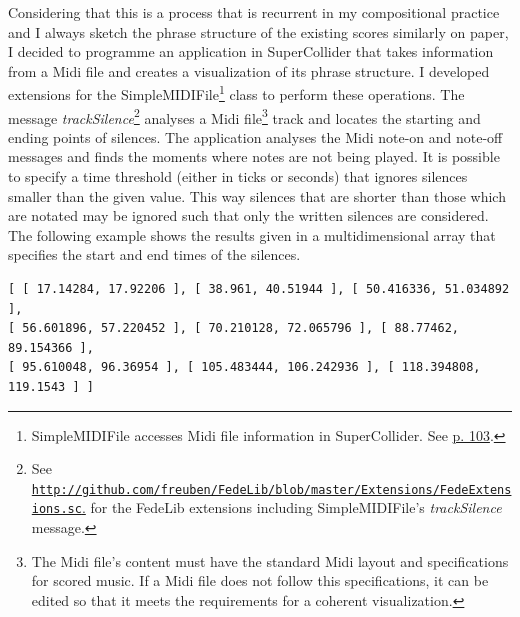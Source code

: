 Considering that this is a process that is recurrent in my compositional practice and I always sketch the phrase structure of the existing scores similarly on paper, I decided to programme an application in SuperCollider that takes information from a Midi file and creates a visualization of its phrase structure. I developed extensions for the SimpleMIDIFile\footnote{SimpleMIDIFile accesses Midi file information in SuperCollider. See \hyperlink{wlib}{p. 103}.} class to perform these operations. The message \emph{trackSilence}\footnote{See \href{http://github.com/freuben/FedeLib/blob/master/Extensions/FedeExtensions.sc}{\texttt{http://github.com/freuben/FedeLib/blob/master/Extensions/FedeExtensions.sc}.} for the FedeLib extensions including SimpleMIDIFile's \emph{trackSilence} message.} analyses a Midi file\footnote{The Midi file's content must have the standard Midi layout and specifications for scored music. If a Midi file does not follow this specifications, it can be edited so that it meets the requirements for a coherent visualization.} track and locates the starting and ending points of silences. The application analyses the Midi note-on and note-off messages and finds the moments where notes are not being played. It is possible to specify a time threshold (either in ticks or seconds) that ignores silences smaller than the given value. This way silences that are shorter than those which are notated may be ignored such that only the written silences are considered. The following example shows  the results given in a multidimensional array that specifies the start and end times of the silences.
\begin{verbatim}
[ [ 17.14284, 17.92206 ], [ 38.961, 40.51944 ], [ 50.416336, 51.034892 ], 
[ 56.601896, 57.220452 ], [ 70.210128, 72.065796 ], [ 88.77462, 89.154366 ], 
[ 95.610048, 96.36954 ], [ 105.483444, 106.242936 ], [ 118.394808, 119.1543 ] ]
\end{verbatim}

